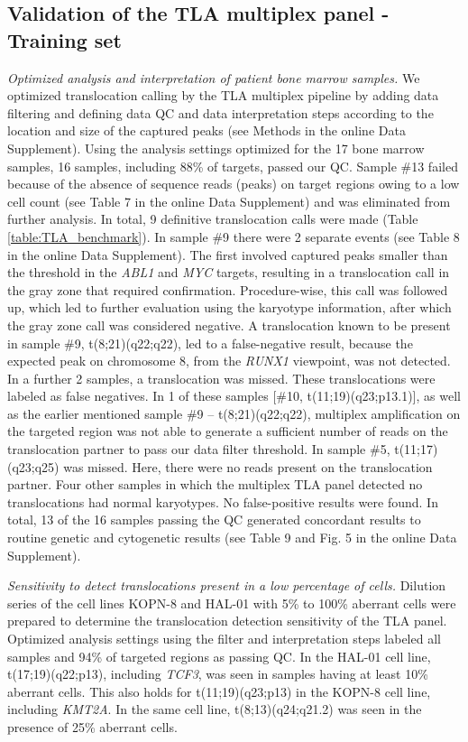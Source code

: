 \subsection{Validation of the TLA multiplex panel - Training set}
\textsl{Optimized analysis and interpretation of patient bone marrow samples.}
We optimized translocation calling by the TLA multiplex pipeline by adding data filtering and defining data QC and data interpretation steps according to the location and size of the captured peaks (see Methods in the online Data Supplement). 
Using the analysis settings optimized for the 17 bone marrow samples, 16 samples, including 88\% of targets, passed our QC. 
Sample \#13 failed because of the absence of sequence reads (peaks) on target regions owing to a low cell count (see Table 7 in the online Data Supplement) and was eliminated from further analysis. 
In total, 9 definitive translocation calls were made (Table \ref{table:TLA_benchmark}). In sample \#9 there were 2 separate events (see Table 8 in the online Data Supplement).
The first involved captured peaks smaller than the threshold in the \textsl{ABL1} and \textsl{MYC} targets, resulting in a translocation call in the gray zone that required confirmation. 
Procedure-wise, this call was followed up, which led to further evaluation using the karyotype information, after which the gray zone call was considered negative. 
A translocation known to be present in sample \#9, t(8;21)(q22;q22), led to a false-negative result, because the expected peak on chromosome 8, from the \textsl{RUNX1} viewpoint, was not detected. 
In a further 2 samples, a translocation was missed. 
These translocations were labeled as false negatives. 
In 1 of these samples [\#10, t(11;19)(q23;p13.1)], as well as the earlier mentioned sample \#9 -- t(8;21)(q22;q22), multiplex amplification on the targeted region was not able to generate a sufficient number of reads on the translocation partner to pass our data filter threshold. 
In sample \#5, t(11;17)(q23;q25) was missed.
Here, there were no reads present on the translocation partner. 
Four other samples in which the multiplex TLA panel detected no translocations had normal karyotypes. 
No false-positive results were found.
In total, 13 of the 16 samples passing the QC generated concordant results to routine genetic and cytogenetic results (see Table 9 and Fig. 5 in the online Data Supplement).

\hfill %

\noindent\textsl{Sensitivity to detect translocations present in a low percentage of cells.}
Dilution series of the cell lines KOPN-8 and HAL-01 with 5\% to 100\% aberrant cells were prepared to determine the translocation detection sensitivity of the TLA panel. 
Optimized analysis settings using the filter and interpretation steps labeled all samples and 94\% of targeted regions as passing QC. 
In the HAL-01 cell line, t(17;19)(q22;p13), including \textsl{TCF3}, was seen in samples having at least 10\% aberrant cells. 
This also holds for t(11;19)(q23;p13) in the KOPN-8 cell line, including \textsl{KMT2A}. In the same cell line, t(8;13)(q24;q21.2) was seen in the presence of 25\% aberrant cells. 

